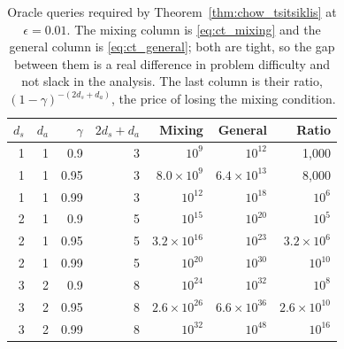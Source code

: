 \begin{table}[htbp]
\centering
\caption{Oracle queries required by Theorem~\ref{thm:chow_tsitsiklis} at $\epsilon = 0.01$. The mixing column is \eqref{eq:ct_mixing} and the general column is \eqref{eq:ct_general}; both are tight, so the gap between them is a real difference in problem difficulty and not slack in the analysis. The last column is their ratio, $(1-\gamma)^{-(2d_s+d_a)}$, the price of losing the mixing condition.}
\label{tab:curse_chow_tsitsiklis}
\begin{tabular}{rrrrrrr}
\toprule
$d_s$ & $d_a$ & $\gamma$ & $2d_s + d_a$ & Mixing & General & Ratio \\
\midrule
1 & 1 & 0.9 & 3 & $10^{9}$ & $10^{12}$ & 1,000 \\
1 & 1 & 0.95 & 3 & $8.0 \times 10^{9}$ & $6.4 \times 10^{13}$ & 8,000 \\
1 & 1 & 0.99 & 3 & $10^{12}$ & $10^{18}$ & $10^{6}$ \\
2 & 1 & 0.9 & 5 & $10^{15}$ & $10^{20}$ & $10^{5}$ \\
2 & 1 & 0.95 & 5 & $3.2 \times 10^{16}$ & $10^{23}$ & $3.2 \times 10^{6}$ \\
2 & 1 & 0.99 & 5 & $10^{20}$ & $10^{30}$ & $10^{10}$ \\
3 & 2 & 0.9 & 8 & $10^{24}$ & $10^{32}$ & $10^{8}$ \\
3 & 2 & 0.95 & 8 & $2.6 \times 10^{26}$ & $6.6 \times 10^{36}$ & $2.6 \times 10^{10}$ \\
3 & 2 & 0.99 & 8 & $10^{32}$ & $10^{48}$ & $10^{16}$ \\
\bottomrule
\end{tabular}
\end{table}
